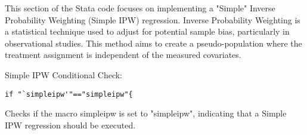 \documentclass{article}
\begin{document}
\vspace{0.3cm}This section of the Stata code focuses on implementing a "Simple" Inverse Probability Weighting (Simple IPW) regression. Inverse Probability Weighting is a statistical technique used to adjust for potential sample bias, particularly in observational studies. This method aims to create a pseudo-population where the treatment assignment is independent of the measured covariates.\newline

Simple IPW Conditional Check:
\begin{mdframed}
\begin{verbatim}
if "`simpleipw'"=="simpleipw"{
\end{verbatim}
\end{mdframed}
\vspace{0.3cm}Checks if the macro simpleipw is set to "simpleipw", indicating that a Simple IPW regression should be executed.
\end{document}
